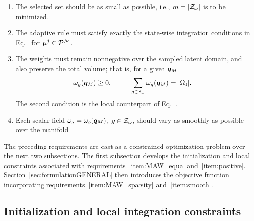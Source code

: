 \documentclass[preprint,10pt]{elsarticle}  %
\begin{document}
\begin{enumerate}
\item \label{item:MAW_sparsity}
The selected set should be  as small as possible, i.e.,
\(m=|\mathcal{Z}_{\omega}|\) is to be minimized.

\item \label{item:MAW_equa}
The adaptive rule must satisfy exactly the state-wise integration
conditions in Eq.~ for \(\bm{\mu}^{j}\in\mathcal{P}^{\mathcal{M}}\).

\item \label{item:positive}
The weights must remain nonnegative over the sampled latent domain, and also
preserve the total volume; that is, for a given ${\bm{q}_M}$
\[
\omega_{g}(\bm{q}_M) \ge 0,   \hspace{1cm} \sum_{g\in\mathcal{Z}_{\omega}}\omega_{g}(\bm{q}_M)=|\Omega_0|.
\]
The second condition is the local counterpart of Eq.~.

\item \label{item:smooth}
 Each scalar field
\(\omega_{g}=\omega_{g}(\bm{q}_M)\), \(g\in\mathcal{Z}_{\omega}\), should vary as smoothly
as possible over the manifold.




\end{enumerate}

The preceding requirements are cast as a constrained optimization
problem over the next two subsections. The first subsection develops the
initialization and local constraints associated with
requirements~\ref{item:MAW_equa} and~\ref{item:positive}.
Section~\ref{sec:formulationGENERAL} then introduces the objective
function incorporating requirements~\ref{item:MAW_sparsity}
and~\ref{item:smooth}.

\subsection{Initialization and local integration constraints}
\label{sec:MAW_local_constraints}
\end{document}
